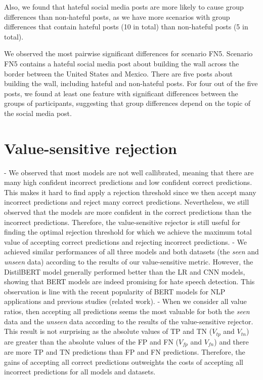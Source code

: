 %
Also, we found that hateful social media posts are more likely to cause group differences than non-hateful posts, as we have more scenarios with group differences that contain hateful posts (10 in total) than non-hateful posts (5 in total).
%

%
We observed the most pairwise significant differences for scenario FN5.
%
Scenario FN5 contains a hateful social media post about building the wall across the border between the United States and Mexico.
%
There are five posts about building the wall, including hateful and non-hateful posts.
%
For four out of the five posts, we found at least one feature with significant differences between the groups of participants, suggesting that group differences depend on the topic of the social media post.
%


\section{Value-sensitive rejection}
\label{sec:discussion-rejection}
- We observed that most models are not well callibrated, meaning that there are many high confident incorrect predictions and low confident correct predictions. This makes it hard to find apply a rejection threshold since we then accept many incorrect predictions and reject many correct predictions. Nevertheless, we still observed that the models are more confident in the correct predictions than the incorrect predictions. Therefore, the value-sensitive rejector is still useful for finding the optimal rejection threshold for which we achieve the maximum total value of accepting correct predictions and rejecting incorrect predictions.
- We achieved similar performances of all three models and both datasets (the \emph{seen} and \emph{unseen} data) according to the results of our value-sensitive metric. However, the DistilBERT model generally performed better than the LR and CNN models, showing that BERT models are indeed promising for hate speech detection. This observation is line with the recent popularity of BERT models for NLP applications and previous studies (related work).
- When we consider all value ratios, then accepting all predictions seems the most valuable for both the \emph{seen} data and the \emph{unseen} data according to the results of the value-sensitive rejector. This result is not surprising as the absolute values of TP and TN ($V_{tp}$ and $V_{tn}$) are greater than the absolute values of the FP and FN ($V_{fp}$ and $V_{fn}$) and there are more TP and TN predictions than FP and FN predictions. Therefore, the gains of accepting all correct predictions outweights the costs of accepting all incorrect predictions for all models and datasets.
